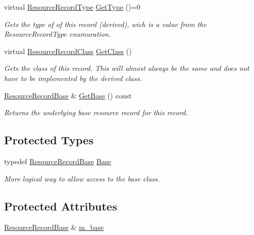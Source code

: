 \begin{DoxyCompactItemize}
virtual \hyperlink{namespace_senergy_1_1_dns_a590bfd748c955364770f5ce358d9dfe0}{Resource\-Record\-Type} \hyperlink{class_senergy_1_1_dns_1_1_resource_record_interface_af895ba199749599d42f8e6a737eb9118}{Get\-Type} ()=0
\begin{DoxyCompactList}\small\item\em Gets the type of of this record (derived), wich is a value from the Resource\-Record\-Type enumuration. \end{DoxyCompactList}\item 
virtual \hyperlink{namespace_senergy_1_1_dns_a953f153bc411213d621d00c1e1b3eb9d}{Resource\-Record\-Class} \hyperlink{class_senergy_1_1_dns_1_1_resource_record_interface_a4332e80632928d846abe9a58f912c217}{Get\-Class} ()
\begin{DoxyCompactList}\small\item\em Gets the class of this record. This will almost always be the same and does not have to be implemented by the derived class. \end{DoxyCompactList}\item 
\hyperlink{class_senergy_1_1_dns_1_1_resource_record_base}{Resource\-Record\-Base} \& \hyperlink{class_senergy_1_1_dns_1_1_resource_record_interface_a2d83a278096ff51e7c8fb9a5e77f70a5}{Get\-Base} () const 
\begin{DoxyCompactList}\small\item\em Returns the underlying base resource record for this record. \end{DoxyCompactList}\end{DoxyCompactItemize}
\subsection*{Protected Types}
\begin{DoxyCompactItemize}
\item 
typedef \hyperlink{class_senergy_1_1_dns_1_1_resource_record_base}{Resource\-Record\-Base} \hyperlink{class_senergy_1_1_dns_1_1_resource_record_interface_a59bcfc62cfc3a68464245b13ad3785e6}{Base}
\begin{DoxyCompactList}\small\item\em More logical way to allow access to the base class. \end{DoxyCompactList}\end{DoxyCompactItemize}
\subsection*{Protected Attributes}
\begin{DoxyCompactItemize}
\item 
\hyperlink{class_senergy_1_1_dns_1_1_resource_record_base}{Resource\-Record\-Base} \& \hyperlink{class_senergy_1_1_dns_1_1_resource_record_interface_a8342949ee3626a2b02021343de3be8a0}{m\-\_\-base}
\end{DoxyCompactItemize}


